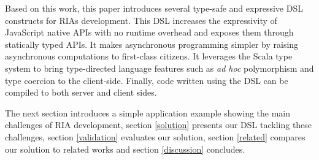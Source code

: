 \documentclass[american,english,runningheads]{llncs}
\begin{document}
Based on this work, this paper introduces several type-safe and expressive DSL constructs for RIAs development. This
DSL increases the expressivity of JavaScript native APIs with no runtime overhead and exposes them through statically
typed APIs. It makes asynchronous programming simpler by raising asynchronous computations to first-class citizens.
It leverages the Scala type system to bring type-directed language features such as \emph{ad hoc} polymorphism and
type coercion to the client-side. Finally, code written using the DSL can be compiled to both server and client
sides.

% 
% 
% 
% 
% 
% 

The next section introduces a simple application example showing the main challenges of RIA development, section
\ref{solution} presents our DSL tackling these challenges, section \ref{validation} evaluates our solution, section
\ref{related} compares our solution to related works and section \ref{discussion} concludes.

\end{document}
